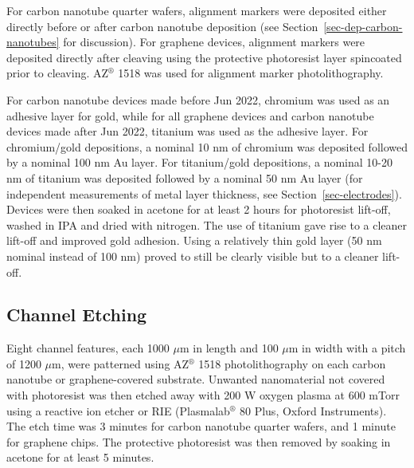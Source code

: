 \documentclass[
  a4paper,
]{scrbook}
\begin{document}
For carbon nanotube quarter wafers, alignment markers were deposited
either directly before or after carbon nanotube deposition (see
Section~\ref{sec-dep-carbon-nanotubes} for discussion). For graphene
devices, alignment markers were deposited directly after cleaving using
the protective photoresist layer spincoated prior to cleaving.
AZ\(^\circledR\) 1518 was used for alignment marker photolithography.

For carbon nanotube devices made before Jun 2022, chromium was used as
an adhesive layer for gold, while for all graphene devices and carbon
nanotube devices made after Jun 2022, titanium was used as the adhesive
layer. For chromium/gold depositions, a nominal 10 nm of chromium was
deposited followed by a nominal 100 nm Au layer. For titanium/gold
depositions, a nominal 10-20 nm of titanium was deposited followed by a
nominal 50 nm Au layer (for independent measurements of metal layer
thickness, see Section~\ref{sec-electrodes}). Devices were then soaked
in acetone for at least 2 hours for photoresist lift-off, washed in IPA
and dried with nitrogen. The use of titanium gave rise to a cleaner
lift-off and improved gold adhesion. Using a relatively thin gold layer
(50 nm nominal instead of 100 nm) proved to still be clearly visible but
to a cleaner lift-off.

\hypertarget{channel-etching}{%
\subsection{Channel Etching}\label{channel-etching}}

Eight channel features, each 1000 \(\mu\)m in length and 100 \(\mu\)m in
width with a pitch of 1200 \(\mu\)m, were patterned using
AZ\(^\circledR\) 1518 photolithography on each carbon nanotube or
graphene-covered substrate. Unwanted nanomaterial not covered with
photoresist was then etched away with 200 W oxygen plasma at 600 mTorr
using a reactive ion etcher or RIE (Plasmalab\(^\circledR\) 80 Plus,
Oxford Instruments). The etch time was 3 minutes for carbon nanotube
quarter wafers, and 1 minute for graphene chips. The protective
photoresist was then removed by soaking in acetone for at least 5
minutes.
\end{document}

